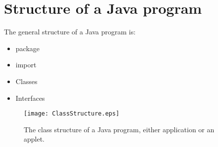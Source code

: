 \section{Structure of a Java program}
The general structure of a Java program is:
\begin{itemize}
\item package
\item import
\item Classes
\item Interfaces
\end{itemize}
\begin{figure}[h]
  \begin{center}
 \texttt{[image: ClassStructure.eps]}
 \caption{The class structure of a Java program, either application or an applet.}
 \label{fig:ClassStructure}
  \end{center}
\end{figure}

